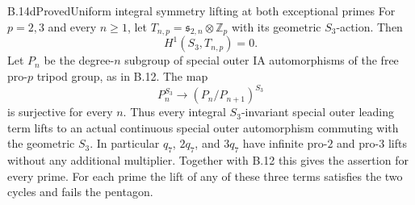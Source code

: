 \begin{statement}{B.14d}{Proved}{Uniform integral symmetry lifting at both exceptional primes}
For $p=2,3$ and every $n\geq1$, let
$T_{n,p}=\mathfrak s_{2,n}\otimes\mathbb Z_p$ with its
geometric $S_3$-action. Then
\[
 H^1(S_3,T_{n,p})=0.
\]
Let $P_n$ be the degree-$n$ subgroup of special outer
IA automorphisms of the free pro-$p$ tripod group, as in
B.12. The map
\[
 P_n^{S_3}\longrightarrow(P_n/P_{n+1})^{S_3}
\]
is surjective for every $n$. Thus every integral
$S_3$-invariant special outer leading term lifts to an
actual continuous special outer automorphism commuting
with the geometric $S_3$. In particular $q_7$, $2q_7$,
and $3q_7$ have infinite pro-$2$ and pro-$3$ lifts without
any additional multiplier. Together with B.12 this gives
the assertion for every prime. For each prime the lift
of any of these three terms satisfies the two cycles
and fails the pentagon.
\end{statement}
